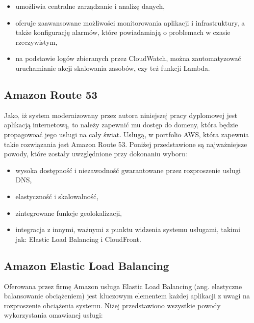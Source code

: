 \documentclass[12pt,twoside]{book}
\begin{document}
    \begin{itemize}
        \item umożliwia centralne zarządzanie i analizę danych,
        \item oferuje zaawansowane możliwości monitorowania aplikacji i infrastruktury, a także konfigurację alarmów, które powiadamiają o problemach w czasie rzeczywistym,
        \item na podstawie logów zbieranych przez CloudWatch, można zautomatyzować uruchamianie akcji skalowania zasobów, czy też funkcji Lambda. \cite{aws.cloud.watch}
    \end{itemize}

    \subsection{Amazon Route 53}
    Jako, iż system modernizowany przez autora niniejszej pracy dyplomowej jest aplikacją internetową, to należy zapewnić mu dostęp do domeny, która będzie propagowoać jego usługi na cały świat. Usługą, w portfolio AWS, która zapewnia takie rozwiązania jest Amazon Route 53. Poniżej przedstawione są najważniejsze powody, które zostały uwzględnione przy dokonaniu wyboru:

    \begin{itemize}
        \item wysoka dostępność i niezawodność gwarantowane przez rozproszenie usługi DNS,
        \item elastyczność i skalowalność,
        \item zintegrowane funkcje geolokalizacji,
        \item integracja z innymi, ważnymi z punktu widzenia systemu usługami, takimi jak: Elastic Load Balancing i CloudFront. \cite{aws.route53}
    \end{itemize}

    \subsection{Amazon Elastic Load Balancing}
    Oferowana przez firmę Amazon usługa Elastic Load Balancing (ang. elastyczne balansowanie obciążeniem) jest kluczowym elementem każdej aplikacji z uwagi na rozproszenie obciążenia systemu. Niżej przedstawiono wszystkie powody wykorzystania omawianej usługi:
\end{document}
